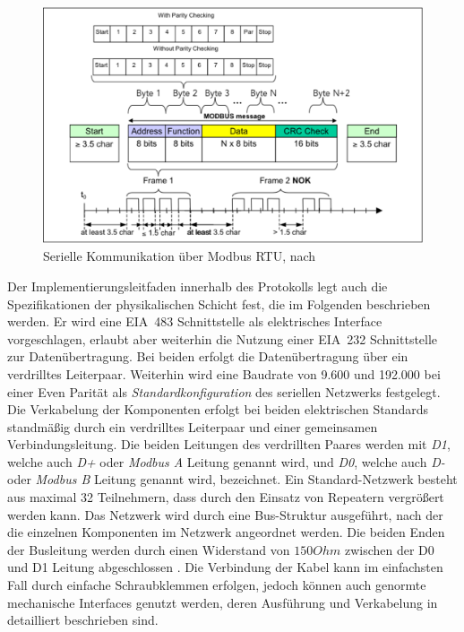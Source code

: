 \begin{figure}
\centering
\includegraphics[width=\textwidth]{abbildungen/20160321_rtu}
\caption[Serielle Kommunikation über Modbus RTU]{Serielle Kommunikation über Modbus RTU, nach \cite[S.~12f.]{mod06ser}}
\label{fig:modbusrtu}
\end{figure}

Der Implementierungsleitfaden innerhalb des Protokolls legt auch die Spezifikationen der physikalischen Schicht fest, die im Folgenden beschrieben werden.
Er wird eine EIA~483 Schnittstelle als elektrisches Interface vorgeschlagen, erlaubt aber weiterhin die Nutzung einer EIA~232 Schnittstelle zur Datenübertragung. Bei beiden erfolgt die Datenübertragung über ein verdrilltes Leiterpaar. Weiterhin wird eine Baudrate von 9.600 und 192.000 bei einer Even Parität als \textit{Standardkonfiguration} des seriellen Netzwerks festgelegt. Die Verkabelung der Komponenten erfolgt bei beiden elektrischen Standards standmäßig durch ein verdrilltes Leiterpaar und einer gemeinsamen Verbindungsleitung. Die beiden Leitungen des verdrillten Paares werden mit \textit{D1}, welche auch \textit{D+} oder \textit{Modbus A} Leitung genannt wird, und \textit{D0}, welche auch \textit{D-} oder \textit{Modbus B} Leitung genannt wird, bezeichnet. Ein Standard-Netzwerk besteht aus maximal 32 Teilnehmern, dass durch den Einsatz von Repeatern vergrößert werden kann. Das Netzwerk wird durch eine Bus-Struktur ausgeführt, nach der die einzelnen Komponenten im Netzwerk angeordnet werden. Die beiden Enden der Busleitung werden durch einen Widerstand von $150 Ohm$ zwischen der D0 und D1 Leitung abgeschlossen \cite[S.~20ff.]{mod06ser}.
Die Verbindung der Kabel kann im einfachsten Fall durch einfache Schraubklemmen erfolgen, jedoch können auch genormte mechanische Interfaces genutzt werden, deren Ausführung und Verkabelung in \cite[S.~29ff.]{mod06ser} detailliert beschrieben sind.

